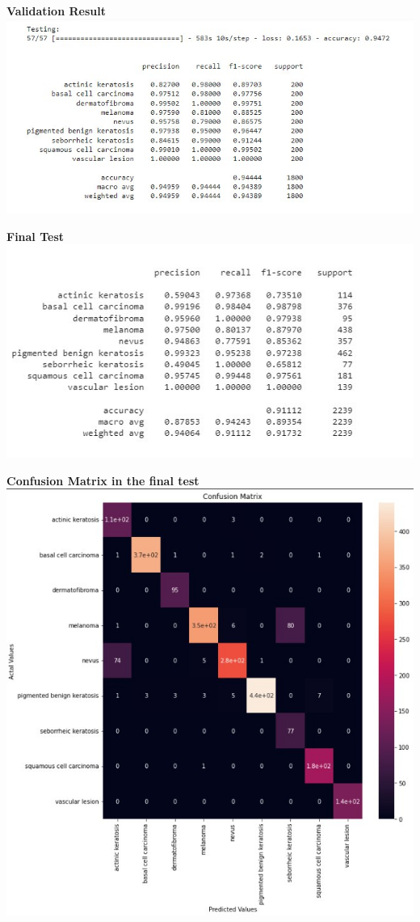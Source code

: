 \documentclass{article}
\begin{document}
	\begin{center}
		\textbf{Validation Result} \\
		\includegraphics[scale=0.9]{./Fig/validation_reslut.jpg}
	\end{center}

	\begin{center}
		\textbf{Final Test} \\
		\includegraphics[scale=0.9]{./Fig/validation_test.jpg}
	\end{center}

	\begin{center}
		\textbf{Confusion Matrix in the final test} \\
		\includegraphics[scale=0.6]{./Fig/confiuson_matrix.jpg}
	\end{center}
\end{document}
